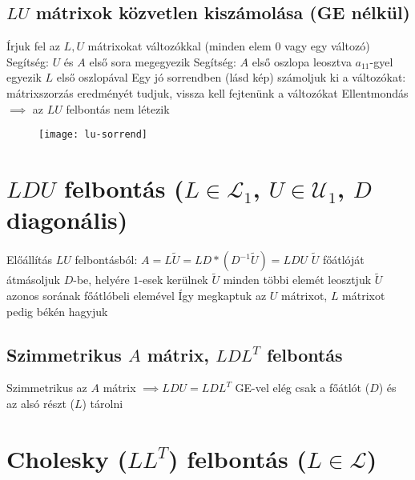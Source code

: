 \documentclass[12pt,a4paper]{article}
\begin{document}
\subsection{$LU$ mátrixok közvetlen kiszámolása (GE nélkül)}

\begin{outline}
	\1 Írjuk fel az $L,U$ mátrixokat változókkal (minden elem $0$ vagy egy változó)
		\2 Segítség: $U$ és $A$ első sora megegyezik
		\2 Segítség: $A$ első oszlopa leosztva $a_{11}$-gyel egyezik $L$ első oszlopával
	\1 Egy jó sorrendben (lásd kép) számoljuk ki a változókat: mátrixszorzás eredményét tudjuk, vissza kell fejtenünk a változókat
		\2 Ellentmondás $\implies$ az $LU$ felbontás nem létezik
\end{outline}

\begin{figure}[h!]
	\centering
	\texttt{[image: lu-sorrend]}
\end{figure}

\pagebreak

\section{$LDU$ felbontás ($L \in \mathcal{L}_1$, $U \in \mathcal{U}_1$, $D$ diagonális)}

\begin{outline}
	\1 Előállítás $LU$ felbontásból: $A = L \widetilde{U} = LD * (D^{-1} \widetilde{U}) = LDU$
		\2 $\widetilde{U}$ főátlóját átmásoljuk $D$-be, helyére $1$-esek kerülnek
		\2 $\widetilde{U}$ minden többi elemét leosztjuk $\widetilde{U}$ azonos sorának főátlóbeli elemével
		\2 Így megkaptuk az $U$ mátrixot, $L$ mátrixot pedig békén hagyjuk
\end{outline}

\subsection{Szimmetrikus $A$ mátrix, $LDL^T$ felbontás}

\begin{outline}
	\1 Szimmetrikus az $A$ mátrix $\implies LDU=LDL^T$
	\1 GE-vel elég csak a főátlót ($D$) és az alsó részt ($L$) tárolni
\end{outline}

\section{Cholesky ($LL^T$) felbontás ($L \in \mathcal{L}$)}
\end{document}
